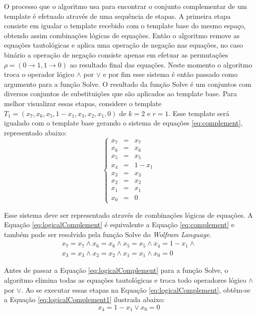 O processo que o algoritmo usa para encontrar o conjunto complementar de um template é efetuado através de uma sequência de etapas. A primeira etapa consiste em igualar o template recebido com o template base do mesmo espaço, obtendo assim combinações lógicas de equações. Então o algoritmo remove as equações tautológicas e aplica uma operação de negação nas equações, no caso binário a operação de negação consiste apenas em efetuar as permutações $\rho = (0 \rightarrow 1, 1 \rightarrow 0)$ ao resultado final das equações. Neste momento o algoritmo troca o operador lógico $\wedge$ por $\vee$ e por fim esse sistema é então passado como argumento para a função Solve. O resultado da função Solve é um conjuntos com diversos conjuntos de substituições que são aplicados ao template base. Para melhor visualizar essas etapas, considere o template $T_1 = (x_7, x_6, x_5, 1 - x_1, x_3, x_2, x_1, 0)$ de $k=2$ e $r=1$. Esse template será igualado com o template base gerando o sistema de equações \ref{eq:complement}, representado abaixo:
\begin{equation}
\left\{\begin{matrix}
x_7 & = & x_7	\\ 
x_6 & = & x_6	\\ 
x_5 & = & x_5	\\ 
x_4 & = & 1 - x_1 \\ 
x_3 & = & x_3	\\ 
x_2 & = & x_2	\\ 
x_1 & = & x_1	\\ 
x_0 & = & 0
\end{matrix}\right.
\label{eq:complement}
\end{equation}

Esse sistema deve ser representado através de combinações lógicas de equações. A Equação \ref{eq:logicalComplement} é equivalente a Equação \ref{eq:complement} e também pode ser resolvido pela função Solve do \textit{Wolfram Language}.
\begin{equation}
\begin{split}
x_7 = x_7	\wedge  
x_6 = x_6	\wedge  
x_5 = x_5	\wedge  
x_4 = 1 - x_1 \wedge  \\
x_3 = x_3	\wedge  
x_2 = x_2	\wedge  
x_1 = x_1	\wedge  
x_0 = 0
\end{split}
\label{eq:logicalComplement}
\end{equation}

Antes de passar a Equação \ref{eq:logicalComplement} para a função Solve, o algoritmo elimina todas as equações tautológicas e troca todo operadores lógico $\wedge$ por $\vee$. Ao se executar essas etapas na Equação \ref{eq:logicalComplement}, obtêm-se a Equação \ref{eq:logicalComplement1} ilustrada abaixo:
\begin{equation}
x_4 = 1 - x_1 \vee x_0 = 0
\label{eq:logicalComplement1}
\end{equation}

